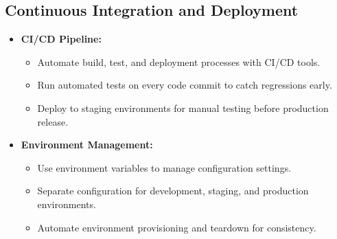 \subsection{Continuous Integration and Deployment}
\begin{itemize}[leftmargin=*]
    \item \textbf{CI/CD Pipeline:}
    \begin{itemize}
        \item Automate build, test, and deployment processes with CI/CD tools.
        \item Run automated tests on every code commit to catch regressions early.
        \item Deploy to staging environments for manual testing before production release.
    \end{itemize}
    
    \item \textbf{Environment Management:}
    \begin{itemize}
        \item Use environment variables to manage configuration settings.
        \item Separate configuration for development, staging, and production environments.
        \item Automate environment provisioning and teardown for consistency.
    \end{itemize}
\end{itemize}

